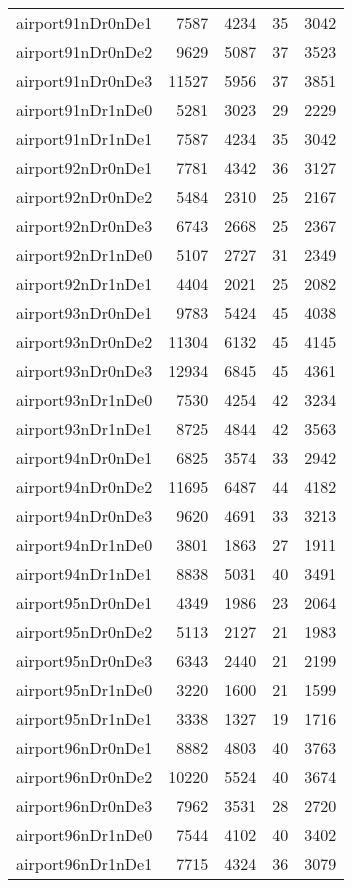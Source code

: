 \begin{longtable}{lrrrr}
airport91nDr0nDe1 & 7587 & 4234 & 35 & 3042 \\
airport91nDr0nDe2 & 9629 & 5087 & 37 & 3523 \\
airport91nDr0nDe3 & 11527 & 5956 & 37 & 3851 \\
airport91nDr1nDe0 & 5281 & 3023 & 29 & 2229 \\
airport91nDr1nDe1 & 7587 & 4234 & 35 & 3042 \\
airport92nDr0nDe1 & 7781 & 4342 & 36 & 3127 \\
airport92nDr0nDe2 & 5484 & 2310 & 25 & 2167 \\
airport92nDr0nDe3 & 6743 & 2668 & 25 & 2367 \\
airport92nDr1nDe0 & 5107 & 2727 & 31 & 2349 \\
airport92nDr1nDe1 & 4404 & 2021 & 25 & 2082 \\
airport93nDr0nDe1 & 9783 & 5424 & 45 & 4038 \\
airport93nDr0nDe2 & 11304 & 6132 & 45 & 4145 \\
airport93nDr0nDe3 & 12934 & 6845 & 45 & 4361 \\
airport93nDr1nDe0 & 7530 & 4254 & 42 & 3234 \\
airport93nDr1nDe1 & 8725 & 4844 & 42 & 3563 \\
airport94nDr0nDe1 & 6825 & 3574 & 33 & 2942 \\
airport94nDr0nDe2 & 11695 & 6487 & 44 & 4182 \\
airport94nDr0nDe3 & 9620 & 4691 & 33 & 3213 \\
airport94nDr1nDe0 & 3801 & 1863 & 27 & 1911 \\
airport94nDr1nDe1 & 8838 & 5031 & 40 & 3491 \\
airport95nDr0nDe1 & 4349 & 1986 & 23 & 2064 \\
airport95nDr0nDe2 & 5113 & 2127 & 21 & 1983 \\
airport95nDr0nDe3 & 6343 & 2440 & 21 & 2199 \\
airport95nDr1nDe0 & 3220 & 1600 & 21 & 1599 \\
airport95nDr1nDe1 & 3338 & 1327 & 19 & 1716 \\
airport96nDr0nDe1 & 8882 & 4803 & 40 & 3763 \\
airport96nDr0nDe2 & 10220 & 5524 & 40 & 3674 \\
airport96nDr0nDe3 & 7962 & 3531 & 28 & 2720 \\
airport96nDr1nDe0 & 7544 & 4102 & 40 & 3402 \\
airport96nDr1nDe1 & 7715 & 4324 & 36 & 3079 \\

\end{longtable}

